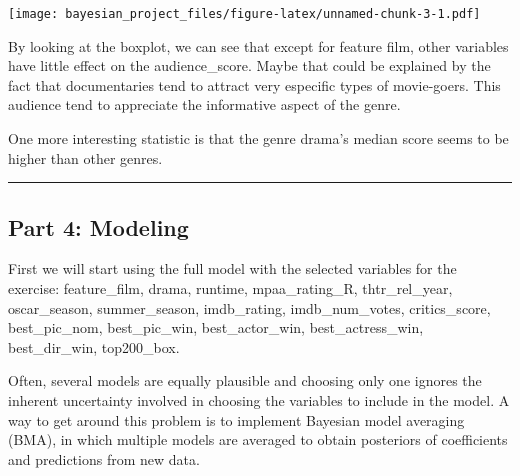 \documentclass[]{article}
\newenvironment{Shaded}{\begin{snugshade}}{\end{snugshade}}
\newcommand{\KeywordTok}[1]{\textcolor[rgb]{0.13,0.29,0.53}{\textbf{#1}}}
\newcommand{\DecValTok}[1]{\textcolor[rgb]{0.00,0.00,0.81}{#1}}
\newcommand{\StringTok}[1]{\textcolor[rgb]{0.31,0.60,0.02}{#1}}
\newcommand{\OperatorTok}[1]{\textcolor[rgb]{0.81,0.36,0.00}{\textbf{#1}}}
\newcommand{\NormalTok}[1]{#1}
\begin{document}
\texttt{[image: bayesian\_project\_files/figure-latex/unnamed-chunk-3-1.pdf]}

By looking at the boxplot, we can see that except for feature film,
other variables have little effect on the audience\_score. Maybe that
could be explained by the fact that documentaries tend to attract very
especific types of movie-goers. This audience tend to appreciate the
informative aspect of the genre.

One more interesting statistic is that the genre drama's median score
seems to be higher than other genres.

\begin{center}\rule{0.5\linewidth}{\linethickness}\end{center}

\subsection{Part 4: Modeling}\label{part-4-modeling}

First we will start using the full model with the selected variables for
the exercise: feature\_film, drama, runtime, mpaa\_rating\_R,
thtr\_rel\_year, oscar\_season, summer\_season, imdb\_rating,
imdb\_num\_votes, critics\_score, best\_pic\_nom, best\_pic\_win,
best\_actor\_win, best\_actress\_win, best\_dir\_win, top200\_box.

\begin{Shaded}
\end{Shaded}

Often, several models are equally plausible and choosing only one
ignores the inherent uncertainty involved in choosing the variables to
include in the model. A way to get around this problem is to implement
Bayesian model averaging (BMA), in which multiple models are averaged to
obtain posteriors of coefficients and predictions from new data.
\end{document}
